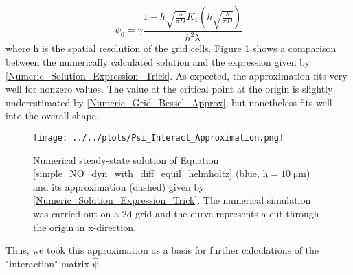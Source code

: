 \documentclass[10pt,a4paper]{article}
\begin{document}
\begin{equation}
\psi_0 = \gamma \frac{1-h\sqrt{\frac{\lambda}{\pi D}} K_1\left( h\sqrt{\frac{\lambda}{\pi D}}\right) }{h^2 \lambda}
\label{Numeric_Grid_Bessel_Approx}
\end{equation}
where $\mathrm{h}$ is the spatial resolution of the grid cells. Figure \ref{Psi_Approximation_Compare} shows a comparison between the numerically calculated solution and the expression given by \ref{Numeric_Solution_Expression_Trick}. As expected, the approximation fits very well for nonzero values. The value at the critical point at the origin is slightly underestimated by \eqref{Numeric_Grid_Bessel_Approx}, but nonetheless fits well into the overall shape.
\begin{figure}
\begin{center}
\texttt{[image: ../../plots/Psi\_Interact\_Approximation.png]}
\end{center}
\caption{Numerical steady-state solution of Equation \eqref{simple_NO_dyn_with_diff_equil_helmholtz} (blue, $\mathrm{h=10\;\mu m}$) and its approximation (dashed) given by \eqref{Numeric_Solution_Expression_Trick}. The numerical simulation was carried out on a 2d-grid and the curve represents a cut through the origin in x-direction.}
\label{Psi_Approximation_Compare}
\end{figure}
Thus, we took this approximation as a basis for further calculations of the "interaction" matrix $\mathrm{\hat{\psi}}$.
\end{document}
